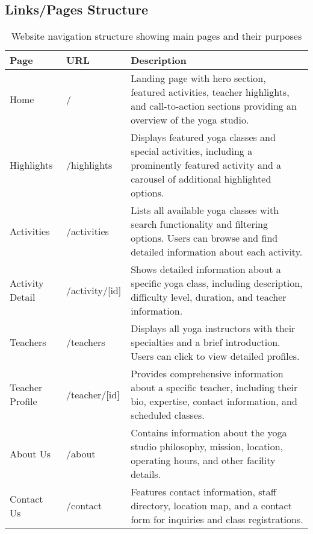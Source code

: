 \subsection{Links/Pages Structure}

\noindent
\begin{table}[H]
    \centering
    \setlength{\tabcolsep}{5pt}
    \renewcommand{\arraystretch}{1.2} 
    \begin{tabular}{|p{2.5cm}|p{2.8cm}|p{8.2cm}|}
        \hline
        \rowcolor{bluepoli!20}
        \textbf{Page} & \textbf{URL} & \textbf{Description} \\
        \hline
        Home & / & Landing page with hero section, featured activities, teacher highlights, and call-to-action sections providing an overview of the yoga studio. \\
        \hline
        Highlights & /highlights & Displays featured yoga classes and special activities, including a prominently featured activity and a carousel of additional highlighted options. \\
        \hline
        Activities & /activities & Lists all available yoga classes with search functionality and filtering options. Users can browse and find detailed information about each activity. \\
        \hline
        Activity Detail & /activity/[id] & Shows detailed information about a specific yoga class, including description, difficulty level, duration, and teacher information. \\
        \hline
        Teachers & /teachers & Displays all yoga instructors with their specialties and a brief introduction. Users can click to view detailed profiles. \\
        \hline
        Teacher Profile & /teacher/[id] & Provides comprehensive information about a specific teacher, including their bio, expertise, contact information, and scheduled classes. \\
        \hline
        About Us & /about & Contains information about the yoga studio philosophy, mission, location, operating hours, and other facility details. \\
        \hline
        Contact Us & /contact & Features contact information, staff directory, location map, and a contact form for inquiries and class registrations. \\
        \hline
    \end{tabular}
    \caption{Website navigation structure showing main pages and their purposes}

\end{table}

